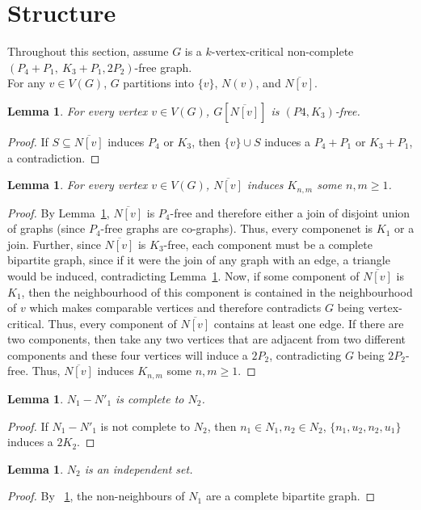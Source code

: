 \documentclass[11pt]{article}
\newtheorem{lemma}[theorem]{Lemma}
\theoremstyle{definition}
\newcommand{\forbid}{$(P_4+P_1,\ K_3+P_1,2P_2)$}
\newcommand{\noneighbs}{\overline{N[v]}}
\begin{document}
\section{Structure}

Throughout this section, assume $G$ is a $k$-vertex-critical non-complete \forbid -free graph.\\

For any $v\in V(G)$, $G$ partitions into $\{v\}$, $N(v)$, and $\overline{N[v]}$.


\begin{lemma}\label{lem:P4K3-free}
For every vertex $v\in V(G)$,  $G[\noneighbs]$ is $(P4, K_3)$-free.
\end{lemma}
\begin{proof}
If $S\subseteq\noneighbs$ induces $P_4$ or $K_3$, then $\{v\}\cup S$ induces a $P_4+P_1$ or $K_3+P_1$, a contradiction.
\end{proof}



\begin{lemma}\label{lem:completebipartite}
For every vertex $v\in V(G)$,  $\noneighbs$ induces $K_{n,m}$ some $n,m\ge 1$.
\end{lemma}
\begin{proof}
By Lemma~\ref{lem:P4K3-free}, $\noneighbs$ is $P_4$-free and therefore either a join of disjoint union of graphs (since $P_4$-free graphs are co-graphs). Thus, every componenet is $K_1$ or a join. Further, since $\noneighbs$ is $K_3$-free, each component must be a complete bipartite graph, since if it were the join of any graph with an edge, a triangle would be induced, contradicting Lemma~\ref{lem:P4K3-free}. Now, if some component of $\noneighbs$ is $K_1$, then the neighbourhood of this component is contained in the neighbourhood of $v$ which makes comparable vertices and therefore contradicts $G$ being vertex-critical. Thus, every component of $\noneighbs$ contains at least one edge. If there are two components, then take any two vertices that are adjacent from two different components and these four vertices will induce a $2P_2$, contradicting $G$ being $2P_2$-free. Thus,  $\noneighbs$ induces $K_{n,m}$ some $n,m\ge 1$.
\end{proof}

\begin{lemma}\label{lem:neighbscomplete}
$N_1 - N'_1$ is complete to $N_2$.
\end{lemma}
\begin{proof}
If $N_1 - N'_1$ is not complete to $N_2$, then $n_1 \in N_1, n_2 \in N_2$, $\{ n_1, u_2, n_2, u_1 \}$ induces a $2K_2$.
\end{proof}
\begin{lemma}\label{lem:n2indep}
$N_2$ is an independent set.
\end{lemma}
\begin{proof}
By ~\ref{lem:completebipartite}, the non-neighbours of $N_1$ are a complete bipartite graph.
\end{proof}
\end{document}
